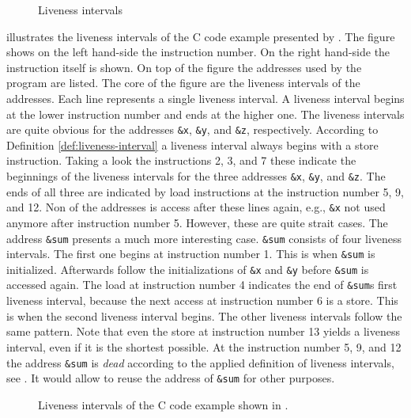 \documentclass[onecolumn, openright, master, english, signatures]{dbrgrptt}
\begin{document}
\begin{figure}[!ht]
  \centering
  
  \caption{Liveness intervals}
  \label{fig:liveness-intervals}
\end{figure}

 illustrates the liveness intervals of the C code example presented by . The figure shows on the left hand-side the instruction number. On the right hand-side the instruction itself is shown. On top of the figure the addresses used by the program are listed. The core of the figure are the liveness intervals of the addresses. Each line represents a single liveness interval. A liveness interval begins at the lower instruction number and ends at the higher one. The liveness intervals are quite obvious for the addresses \texttt{\&x}, \texttt{\&y}, and \texttt{\&z}, respectively. According to Definition \ref{def:liveness-interval} a liveness interval always begins with a store instruction. Taking a look the instructions 2, 3, and 7 these indicate the beginnings of the liveness intervals for the three addresses \texttt{\&x}, \texttt{\&y}, and \texttt{\&z}. The ends of all three are indicated by load instructions at the instruction number 5, 9, and 12. Non of the addresses is access after these lines again, e.g., \texttt{\&x} not used anymore after instruction number 5. However, these are quite strait cases. The address \texttt{\&sum} presents a much more interesting case. \texttt{\&sum} consists of four liveness intervals. The first one begins at instruction number 1. This is when \texttt{\&sum} is initialized. Afterwards follow the initializations of \texttt{\&x} and \texttt{\&y} before \texttt{\&sum} is accessed again. The load at instruction number 4 indicates the end of \texttt{\&sum}s first liveness interval, because the next access at instruction number 6 is a store. This is when the second liveness interval begins. The other liveness intervals follow the same pattern. Note that even the store at instruction number 13 yields a liveness interval, even if it is the shortest possible. At the instruction number 5, 9, and 12 the address \texttt{\&sum} is \emph{dead} according to the applied definition of liveness intervals, see . It would allow to reuse the address of \texttt{\&sum} for other purposes.

\begin{figure}[!ht]
  \centering
  
  \caption{Liveness intervals of the C code example shown in .}
  \label{fig:liveness-intervals-example}
\end{figure}
\end{document}
